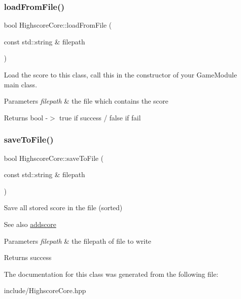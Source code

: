 \subsubsection{\texorpdfstring{load\+From\+File()}{loadFromFile()}}
{\footnotesize\ttfamily bool Highscore\+Core\+::load\+From\+File (\begin{DoxyParamCaption}\item[{const std\+::string \&}]{filepath }\end{DoxyParamCaption})\hspace{0.3cm}{\ttfamily [inline]}}



Load the score to this class, call this in the constructor of your Game\+Module main class. 


\begin{DoxyParams}{Parameters}
{\em filepath} & the file which contains the score \\
\hline
\end{DoxyParams}
\begin{DoxyReturn}{Returns}
bool -\/$>$ true if success / false if fail 
\end{DoxyReturn}
\mbox{\label{class_highscore_core_a7a86c95f26a7b0d527f639f94bf96301}} 
\subsubsection{\texorpdfstring{save\+To\+File()}{saveToFile()}}
{\footnotesize\ttfamily bool Highscore\+Core\+::save\+To\+File (\begin{DoxyParamCaption}\item[{const std\+::string \&}]{filepath }\end{DoxyParamCaption})\hspace{0.3cm}{\ttfamily [inline]}}



Save all stored score in the file (sorted) 

\begin{DoxySeeAlso}{See also}
\hyperlink{class_highscore_core_a12de8f889c9990f769245fc967caa129}{addscore} 
\end{DoxySeeAlso}

\begin{DoxyParams}{Parameters}
{\em filepath} & the filepath of file to write \\
\hline
\end{DoxyParams}
\begin{DoxyReturn}{Returns}
success 
\end{DoxyReturn}


The documentation for this class was generated from the following file\+:\begin{DoxyCompactItemize}
\item 
include/Highscore\+Core.\+hpp\end{DoxyCompactItemize}

